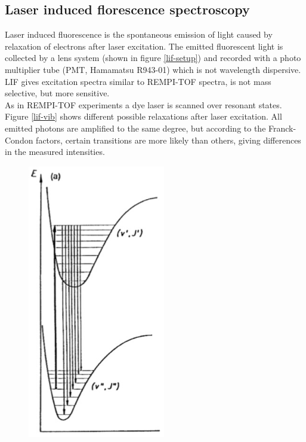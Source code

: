 \documentclass[parskip,12pt,headsepline,a4paper] {scrbook}
\begin{document}
\subsection{Laser induced florescence spectroscopy}
\vspace{-1\baselineskip}
Laser induced fluorescence is the spontaneous emission of light caused by relaxation of electrons after laser excitation. The emitted fluorescent light is collected by a lens system (shown in figure \ref{lif-setup}) and recorded with a photo multiplier tube (PMT, Hamamatsu R943-01) which is not wavelength dispersive. LIF gives excitation spectra similar to REMPI-TOF spectra, is not mass selective, but more sensitive. \\
As in REMPI-TOF experiments a dye laser is scanned over resonant states. Figure \ref{lif-vib} shows different possible relaxations after laser excitation. All emitted photons are amplified to the same degree, but according to the Franck-Condon factors, certain transitions are more likely than others, giving differences in the measured intensities.

\begin{figure}[ht]
\centerline{
\includegraphics[width=6cm]{./measuring_methods/lif-vib.jpg}}
\end{figure}
\end{document}
